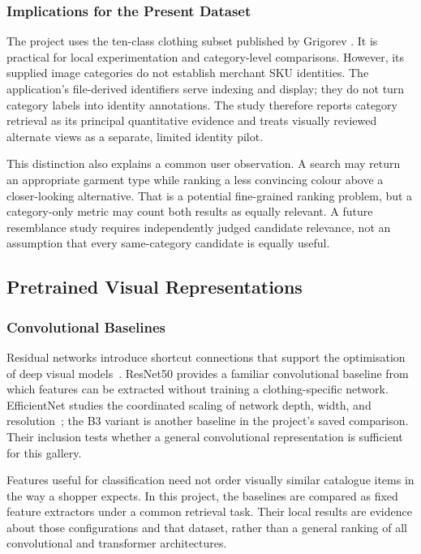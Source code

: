 \subsubsection{Implications for the Present Dataset}
The project uses the ten-class clothing subset published by Grigorev
\cite{GrigorevClothingDataset}. It is practical for local experimentation and
category-level comparisons. However, its supplied image categories do not
establish merchant SKU identities. The application's file-derived identifiers
serve indexing and display; they do not turn category labels into identity
annotations. The study therefore reports category retrieval as its principal
quantitative evidence and treats visually reviewed alternate views as a separate,
limited identity pilot.

This distinction also explains a common user observation. A search may return
an appropriate garment type while ranking a less convincing colour above a
closer-looking alternative. That is a potential fine-grained ranking problem,
but a category-only metric may count both results as equally relevant. A
future resemblance study requires independently judged candidate relevance,
not an assumption that every same-category candidate is equally useful.

\subsection{Pretrained Visual Representations}
\subsubsection{Convolutional Baselines}
Residual networks introduce shortcut connections that support the optimisation
of deep visual models~\cite{He2015ResNet}. ResNet50 provides a familiar
convolutional baseline from which features can be extracted without training
a clothing-specific network. EfficientNet studies the coordinated scaling of
network depth, width, and resolution~\cite{Tan2019EfficientNet}; the B3 variant
is another baseline in the project's saved comparison. Their inclusion tests
whether a general convolutional representation is sufficient for this gallery.

Features useful for classification need not order visually similar catalogue
items in the way a shopper expects. In this project, the baselines are compared
as fixed feature extractors under a common retrieval task. Their local results
are evidence about those configurations and that dataset, rather than a general
ranking of all convolutional and transformer architectures.

